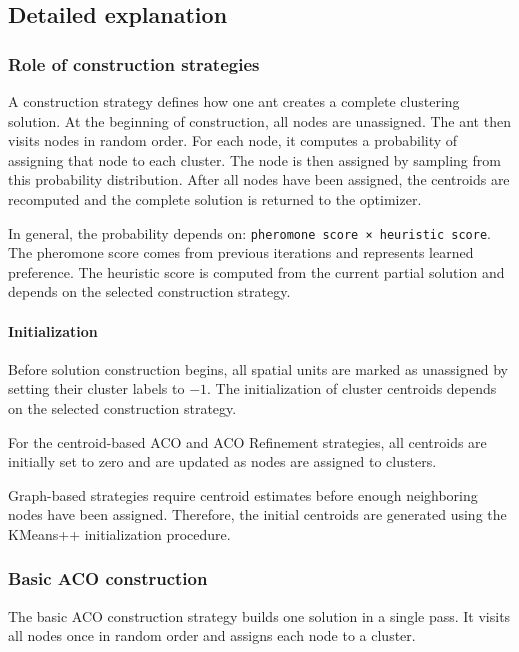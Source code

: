 \documentclass[11pt]{article}
\begin{document}
\subsection{Detailed explanation}

\subsubsection{Role of construction strategies}
A construction strategy defines how one ant creates a complete clustering solution. At the beginning of construction, all nodes are unassigned. The ant then visits nodes in random order. For each node, it computes a probability of assigning that node to each cluster. The node is then assigned by sampling from this probability distribution. After all nodes have been assigned, the centroids are recomputed and the complete solution is returned to the optimizer.

In general, the probability depends on: \texttt{pheromone score × heuristic score}. The pheromone score comes from previous iterations and represents learned preference. The heuristic score is computed from the current partial solution and depends on the selected construction strategy.

\paragraph{Initialization}

Before solution construction begins, all spatial units are marked as unassigned by setting their cluster labels to $-1$. The initialization of cluster centroids depends on the selected construction strategy.

For the centroid-based ACO and ACO Refinement strategies, all centroids are initially set to zero and are updated as nodes are assigned to clusters.

Graph-based strategies require centroid estimates before enough neighboring nodes have been assigned. Therefore, the initial centroids are generated using the KMeans++ initialization procedure. 

\subsubsection{Basic ACO construction}

The basic ACO construction strategy builds one solution in a single pass. It visits all nodes once in random order and assigns each node to a cluster.
\end{document}
